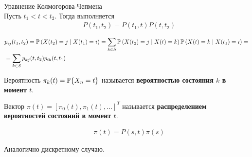 \begin{theorem} Уравнение Колмогорова-Чепмена
    \\
    Пусть $t_1 < t < t_2$. Тогда выполняется
    \begin{align*}
      & P(t_1,t_2) = P(t_1,t)P(t,t_2)
    \end{align*}
\end{theorem}
\begin{Proof}
    \begin{align*}
      & p_{ij}(t_1,t_2) = \mathbb{P}\left( X(t_2) = j \mid X(t_1) = i \right) = \sum_{k \in S}\mathbb{P}\left( X(t_2) = j \mid X(t)=k \right)\mathbb{P}\left( X(t) = k \mid X(t_1) = i \right) = \\
      & = \sum_{k \in S}p_{kj}(t,t_2)p_{ik}(t,t_1)
    \end{align*}
\end{Proof}
\begin{Def}
    Вероятность $\pi_k(t) = \mathbb{P}\{X_n = t\}$ называется \textbf{вероятностью
      состояния $k$ в момент $t$}.
\end{Def}
\begin{Def}
    Вектор $\pi(t) = \left[ \pi_0(t), \pi_1(t), \dots \right]^T$ называется
    \textbf{распределением вероятностей состояний в момент $t$}.
\end{Def}
\begin{theorem}
    \begin{align*}
      & \pi(t) = P(s,t)\pi(s)
    \end{align*}
\end{theorem}
\begin{Proof}
    Аналогично дискретному случаю.
\end{Proof}
